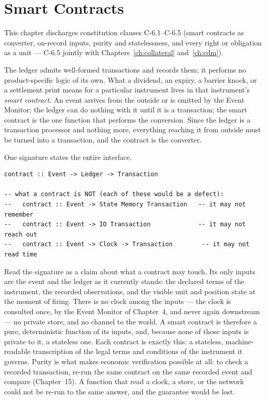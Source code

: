 \section{Smart Contracts}\label{ch:contracts}

This chapter discharges constitution clauses C-6.1--C-6.5 (smart contracts as converter, on-record inputs, purity and statelessness, and every right or obligation as a unit --- C-6.5 jointly with Chapters~\ref{ch:collateral} and~\ref{ch:cdm}).

The ledger admits well-formed transactions and records them; it performs no
product-specific logic of its own. What a dividend, an expiry, a barrier knock,
or a settlement print means for a particular instrument lives in that
instrument's \emph{smart contract}. An event arrives from the outside or is
emitted by the Event Monitor; the ledger can do nothing with it until it is a
transaction; the smart contract is the one function that performs the
conversion. Since the ledger is a transaction processor and nothing more,
everything reaching it from outside must be turned into a transaction, and the
contract is the converter.

One signature states the entire interface.

\begin{lstlisting}
contract :: Event -> Ledger -> Transaction

-- what a contract is NOT (each of these would be a defect):
--   contract :: Event -> State Memory Transaction   -- it may not remember
--   contract :: Event -> IO Transaction             -- it may not reach out
--   contract :: Event -> Clock -> Transaction        -- it may not read time
\end{lstlisting}

Read the signature as a claim about what a contract may touch. Its only inputs
are the event and the ledger as it currently stands: the declared terms of the
instrument, the recorded observations, and the visible unit and position state
at the moment of firing. There is no clock among the inputs --- the clock is
consulted once, by the Event Monitor of Chapter~4, and never again downstream
--- no private store, and no channel to the world. A smart contract is
therefore a pure, deterministic function of its inputs, and, because none of
those inputs is private to it, a stateless one. Each contract is exactly this: a
stateless, machine-readable transcription of the legal terms and conditions of
the instrument it governs. Purity is what makes economic verification possible
at all: to check a recorded transaction, re-run the same contract on the same
recorded event and compare (Chapter~15). A function that read a clock, a store,
or the network could not be re-run to the same answer, and the guarantee would
be lost.

